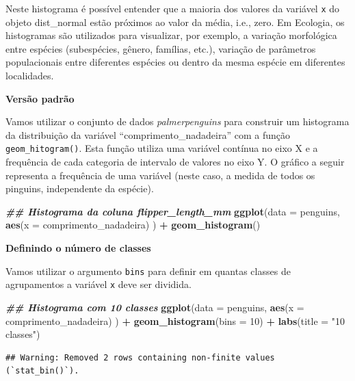 \documentclass[
]{article}
\newenvironment{Shaded}{\begin{snugshade}}{\end{snugshade}}
\newcommand{\AttributeTok}[1]{\textcolor[rgb]{0.13,0.29,0.53}{#1}}
\newcommand{\DecValTok}[1]{\textcolor[rgb]{0.00,0.00,0.81}{#1}}
\newcommand{\DocumentationTok}[1]{\textcolor[rgb]{0.56,0.35,0.01}{\textbf{\textit{#1}}}}
\newcommand{\FunctionTok}[1]{\textcolor[rgb]{0.13,0.29,0.53}{\textbf{#1}}}
\newcommand{\NormalTok}[1]{#1}
\newcommand{\SpecialCharTok}[1]{\textcolor[rgb]{0.81,0.36,0.00}{\textbf{#1}}}
\newcommand{\StringTok}[1]{\textcolor[rgb]{0.31,0.60,0.02}{#1}}
\begin{document}
Neste histograma é possível entender que a maioria dos valores da variável \texttt{x} do objeto dist\_normal estão próximos ao valor da média, i.e., zero. Em Ecologia, os histogramas são utilizados para visualizar, por exemplo, a variação morfológica entre espécies (subespécies, gênero, famílias, etc.), variação de parâmetros populacionais entre diferentes espécies ou dentro da mesma espécie em diferentes localidades.

\textbf{Versão padrão}

Vamos utilizar o conjunto de dados \emph{palmerpenguins} para construir um histograma da distribuição da variável ``comprimento\_nadadeira'' com a função \texttt{geom\_hitogram()}. Esta função utiliza uma variável contínua no eixo X e a frequência de cada categoria de intervalo de valores no eixo Y. O gráfico a seguir representa a frequência de uma variável (neste caso, a medida de todos os pinguins, independente da espécie).

\begin{Shaded}
\begin{Highlighting}[]
\DocumentationTok{\#\# Histograma da coluna flipper\_length\_mm}
\FunctionTok{ggplot}\NormalTok{(}\AttributeTok{data =}\NormalTok{ penguins, }
       \FunctionTok{aes}\NormalTok{(}\AttributeTok{x =}\NormalTok{ comprimento\_nadadeira)}
\NormalTok{       ) }\SpecialCharTok{+}
    \FunctionTok{geom\_histogram}\NormalTok{()}
\end{Highlighting}
\end{Shaded}

\textbf{Definindo o número de classes}

Vamos utilizar o argumento \texttt{bins} para definir em quantas classes de agrupamentos a variável \texttt{x} deve ser dividida.

\begin{Shaded}
\begin{Highlighting}[]
\DocumentationTok{\#\# Histograma com 10 classes}
\FunctionTok{ggplot}\NormalTok{(}\AttributeTok{data =}\NormalTok{ penguins, }
       \FunctionTok{aes}\NormalTok{(}\AttributeTok{x =}\NormalTok{ comprimento\_nadadeira)}
\NormalTok{       ) }\SpecialCharTok{+}
    \FunctionTok{geom\_histogram}\NormalTok{(}\AttributeTok{bins =} \DecValTok{10}\NormalTok{) }\SpecialCharTok{+}
    \FunctionTok{labs}\NormalTok{(}\AttributeTok{title =} \StringTok{"10 classes"}\NormalTok{)}
\end{Highlighting}
\end{Shaded}

\begin{verbatim}
## Warning: Removed 2 rows containing non-finite values (`stat_bin()`).
\end{verbatim}
\end{document}
